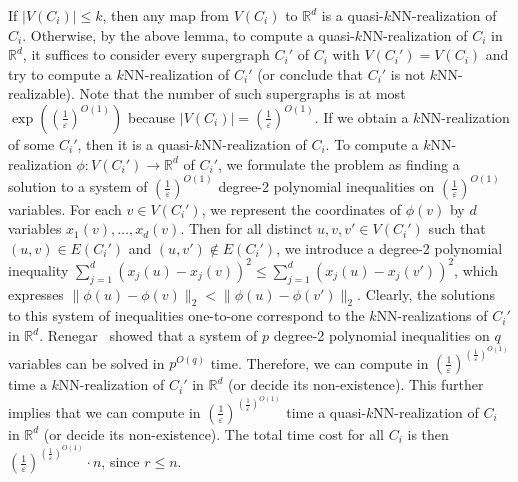 \documentclass[english]{lipics-v2021}
\begin{document}
If $|V(C_i)| \leq k$, then any map from $V(C_i)$ to $\mathbb{R}^d$ is a quasi-$k$NN-realization of $C_i$.
Otherwise, by the above lemma, to compute a quasi-$k$NN-realization of $C_i$ in $\mathbb{R}^d$, it suffices to consider every supergraph $C_i'$ of $C_i$ with $V(C_i') = V(C_i)$ and try to compute a $k$NN-realization of $C_i'$ (or conclude that $C_i'$ is not $k$NN-realizable).
Note that the number of such supergraphs is at most $\exp({(\frac{1}{\varepsilon})^{O(1)}})$ because $|V(C_i)| = (\frac{1}{\varepsilon})^{O(1)}$.
If we obtain a $k$NN-realization of some $C_i'$, then it is a quasi-$k$NN-realization of $C_i$.
To compute a $k$NN-realization $\phi:V(C_i') \rightarrow \mathbb{R}^d$ of $C_i'$, we formulate the problem as finding a solution to a system of $(\frac{1}{\varepsilon})^{O(1)}$ degree-2 polynomial inequalities on $(\frac{1}{\varepsilon})^{O(1)}$ variables.
For each $v \in V(C_i')$, we represent the coordinates of $\phi(v)$ by $d$ variables $x_1(v),\dots,x_d(v)$.
Then for all distinct $u,v,v' \in V(C_i')$ such that $(u,v) \in E(C_i')$ and $(u,v') \notin E(C_i')$, we introduce a degree-2 polynomial inequality $\sum_{j=1}^d (x_j(u)-x_j(v))^2 \leq \sum_{j=1}^d (x_j(u)-x_j(v'))^2$, which expresses $\lVert \phi(u) - \phi(v) \rVert_2 < \lVert \phi(u) - \phi(v') \rVert_2$.
Clearly, the solutions to this system of inequalities one-to-one correspond to the $k$NN-realizations of $C_i'$ in $\mathbb{R}^d$.
Renegar~\cite{renegar:1992} showed that a system of $p$ degree-2 polynomial inequalities on $q$ variables can be solved in $p^{O(q)}$ time.
Therefore, we can compute in $(\frac{1}{\varepsilon})^{(\frac{1}{\varepsilon})^{O(1)}}$ time a $k$NN-realization of $C_i'$ in $\mathbb{R}^d$ (or decide its non-existence).
This further implies that we can compute in $(\frac{1}{\varepsilon})^{(\frac{1}{\varepsilon})^{O(1)}}$ time a quasi-$k$NN-realization of $C_i$ in $\mathbb{R}^d$ (or decide its non-existence).
The total time cost for all $C_i$ is then $(\frac{1}{\varepsilon})^{(\frac{1}{\varepsilon})^{O(1)}} \cdot n$, since $r \leq n$.
\end{document}
